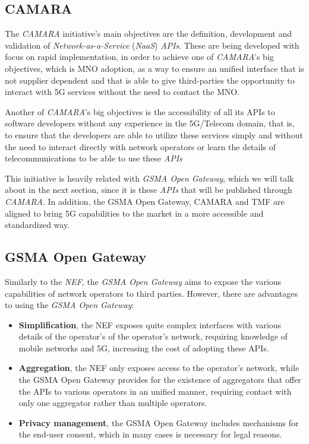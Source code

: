 \subsection{CAMARA}

The \emph{CAMARA} initiative's main objectives are the
definition, development and validation of
\emph{Network-as-a-Service} (\emph{NaaS}) \emph{APIs}. These are
being developed with focus on rapid implementation, in order to
achieve one of \emph{CAMARA}'s big objectives, which is MNO
adoption, as a way to ensure an unified interface that is not
supplier dependent and that is able to give third-parties the
opportunity to interact with 5G services without the need to
contact the MNO.

Another of \emph{CAMARA}'s big objectives is the accessibility of
all its APIs to software developers without any experience in the
5G/Telecom domain, that is, to ensure that the developers are
able to utilize these services simply and without the need to
interact directly with network operators or learn the details of
telecommunications to be able to use these \emph{APIs} 

This initiative is heavily related with \emph{GSMA Open Gateway},
which we will talk about in the next section, since it is these
\emph{APIs} that will be published through \emph{CAMARA}. In
addition, the GSMA Open Gateway, CAMARA and TMF are aligned to
bring 5G capabilities to the market in a more accessible and
standardized way.


\subsection{GSMA Open Gateway}

Similarly to the \emph{NEF}, the \emph{GSMA Open Gateway} aims to
expose the various capabilities of network operators to third
parties. However, there are advantages to using the \emph{GSMA
Open Gateway}:

\begin{itemize} \item \textbf{Simplification}, the NEF exposes
      quite complex interfaces with various details of the
      operator's  of the operator's network, requiring knowledge
      of mobile networks and 5G, increasing the cost of adopting
      these APIs.

    \item \textbf{Aggregation}, the NEF only exposes access to
      the operator's network, while the GSMA Open Gateway
      provides for the existence of aggregators that offer the
      APIs to various operators in an unified manner, requiring
      contact with only one aggregator rather than multiple
      operators.

\item \textbf{Privacy management}, the GSMA Open Gateway includes
mechanisms for the end-user consent, which in many cases is
necessary for legal reasons.\end{itemize}

